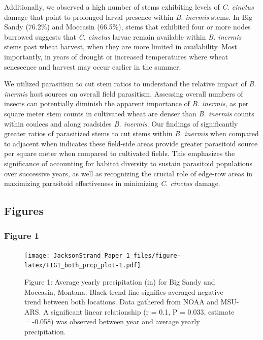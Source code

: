 \documentclass[
]{article}
\begin{document}
Additionally, we observed a high number of stems exhibiting levels of
\emph{C. cinctus} damage that point to prolonged larval presence within
\emph{B. inermis} stems. In Big Sandy (76.2\%) and Moccasin (66.5\%),
stems that exhibited four or more nodes burrowed suggests that \emph{C.
cinctus} larvae remain available within \emph{B. inermis} stems past
wheat harvest, when they are more limited in availability. Most
importantly, in years of drought or increased temperatures where wheat
senescence and harvest may occur earlier in the summer.

We utilized parasitism to cut stem ratios to understand the relative
impact of \emph{B. inermis} host sources on overall field parasitism.
Assessing overall numbers of insects can potentially diminish the
apparent importance of \emph{B. inermis}, as per square meter stem
counts in cultivated wheat are denser than \emph{B. inermis} counts
within coulees and along roadsides \emph{B. inermis}. Our findings of
significantly greater ratios of parasitized stems to cut stems within
\emph{B. inermis} when compared to adjacent when indicates these
field-side areas provide greater parasitoid source per square meter when
compared to cultivated fields. This emphasizes the significance of
accounting for habitat diversity to sustain parasitoid populations over
successive years, as well as recognizing the crucial role of edge-row
areas in maximizing parasitoid effectiveness in minimizing \emph{C.
cinctus} damage.

\subsection{Figures}\label{figures}

\subsubsection{Figure 1}\label{figure1}

\begin{figure}
\centering
\texttt{[image: JacksonStrand\_Paper 1\_files/figure-latex/FIG1\_both\_prcp\_plot-1.pdf]}
\caption{Figure 1: Average yearly precipitation (in) for Big Sandy and
Moccasin, Montana. Black trend line signifies averaged negative trend
between both locations. Data gathered from NOAA and MSU-ARS. A
significant linear relationship (r = 0.1, P = 0.033, estimate = -0.058)
was observed between year and average yearly precipitation.}
\end{figure}
\end{document}
